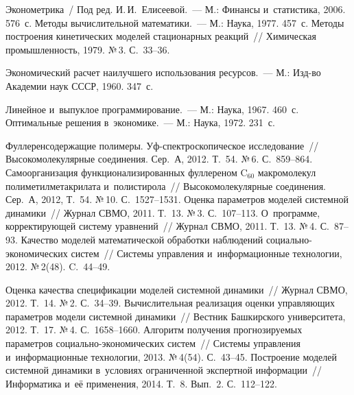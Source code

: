 \begin{multicols}{2}
{{\begin{thebibliography}{99}
Эконометрика~/ Под ред. И.\,И.~Елисеевой.~--- М.: Финансы и~статистика,
2006. 576~с.
 Методы вычислительной математики.~--- М.: Наука, 1977.
457~с.
 Методы построения
кинетических моделей стационарных реакций~// Химическая промышленность,
1979. №\,3. С.~33--36.

 Экономический расчет наилучшего использования
ресурсов.~--- М.: Изд-во Академии наук СССР, 1960. 347~с.

 Линейное и~выпуклое
программирование.~--- М.: Наука, 1967. 460~с.
 Оптимальные решения в~экономике.~---
М.: Наука, 1972. 231~с.

 Фуллеренсодержащие полимеры. Уф-спектроскопическое
исследование~// Высокомолекулярные соединения. Сер.~А, 2012. Т.~54. №\,6.
С.~859--864.
 Самоорганизация
функционализированных фуллереном C$_{60}$ макромолекул
полиметилметакрилата и~полистирола~// Высокомолекулярные
соединения. Сер.~А, 2012, Т.~54. №\,10. С.~1527--1531.
 Оценка параметров моделей системной
динамики~// Журнал СВМО, 2011. Т.~13. №\,3. С.~107--113.
 О~программе,
корректирующей систему уравнений~// Журнал СВМО, 2011. Т.~13. №\,4.
С.~87--93.
 Качество моделей математической обработки
наблюдений социально-эко\-но\-ми\-че\-ских систем~// Системы управления и~информационные технологии, 2012. №\,2(48). C.~44--49.

\pagebreak


 Оценка качества спецификации моделей
системной динамики~// Журнал СВМО, 2012. Т.~14. №\,2. С.~34--39.
 Вычислительная реализация
оценки управляющих па\-ра\-мет\-ров модели системной динамики~// Вестник
Башкирского университета, 2012. Т.~17. №\,4. С.~1658--1660.
 Алгоритм получения
прогнозируемых параметров социально-эко\-но\-ми\-че\-ских систем~// Системы
управления и~информационные технологии, 2013. №\,4(54). С.~43--45.
 Построение моделей сис\-тем\-ной динамики в~условиях ограниченной экспертной информации~// Информатика и~её
применения, 2014. Т.~8. Вып.~2. С.~112--122.


 \end{thebibliography}

 }
 }

\end{multicols}

